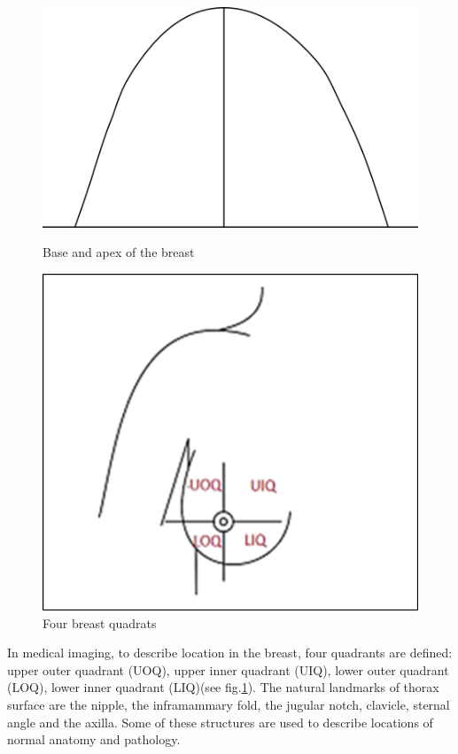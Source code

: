 \begin{figure}[h]
\endminipage\hfill
{}
  \includegraphics[width=\linewidth]{figures/breastBase.PNG}
  \caption{Base and apex of the breast}\label{fig:breast_apex}
\endminipage\hfill
{}
  \includegraphics[width=\linewidth]{figures/Breast_quadrants.png}
  \caption{Four breast quadrats}\label{fig:breast_quadrants}
\endminipage\hfill
{}
\endminipage\hfill
\end{figure}
In medical imaging, to describe location in the breast, four quadrants are defined: upper outer quadrant (UOQ), upper inner quadrant (UIQ), lower outer quadrant (LOQ), lower inner quadrant (LIQ)(see fig.\ref{fig:breast_quadrants}).   The natural landmarks of thorax surface are the nipple, the inframammary fold, the jugular notch, clavicle, sternal angle and the axilla. Some of these structures are used to describe locations of normal anatomy and pathology.

